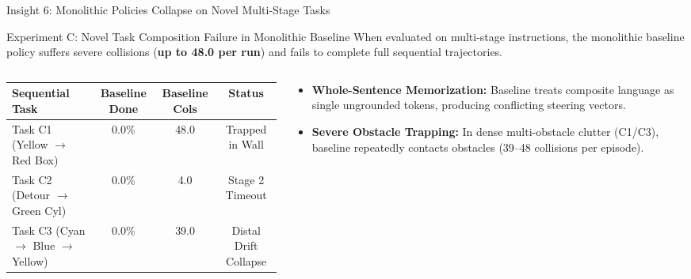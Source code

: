 \documentclass[aspectratio=169, 10pt]{beamer}
\begin{document}
\begin{frame}{Insight 6: Monolithic Policies Collapse on Novel Multi-Stage Tasks}
  \begin{block}{Experiment C: Novel Task Composition Failure in Monolithic Baseline}
    When evaluated on multi-stage instructions, the monolithic baseline policy suffers severe collisions (\textbf{up to 48.0 per run}) and fails to complete full sequential trajectories.
  \end{block}
  \vspace{-0.2cm}
  \begin{columns}[T]
    \begin{column}{0.52\textwidth}
      \setlength{\tabcolsep}{2pt}
      \begin{table}
        \centering
        \scriptsize
        \begin{tabular}{lccc}
          \toprule
          \textbf{Sequential Task} & \textbf{Baseline Done} & \textbf{Baseline Cols} & \textbf{Status} \\
          \midrule
          Task C1 (Yellow $\to$ Red Box) & 0.0\% & 48.0 & Trapped in Wall \\
          Task C2 (Detour $\to$ Green Cyl) & 0.0\% & 4.0 & Stage 2 Timeout \\
          Task C3 (Cyan $\to$ Blue $\to$ Yellow) & 0.0\% & 39.0 & Distal Drift Collapse \\
          \bottomrule
        \end{tabular}
      \end{table}
    \end{column}
    \begin{column}{0.44\textwidth}
      \begin{itemize}
        \item \textbf{Whole-Sentence Memorization:} Baseline treats composite language as single ungrounded tokens, producing conflicting steering vectors.
        \item \textbf{Severe Obstacle Trapping:} In dense multi-obstacle clutter (C1/C3), baseline repeatedly contacts obstacles (39--48 collisions per episode).
      \end{itemize}
    \end{column}
  \end{columns}
\end{frame}
\end{document}

